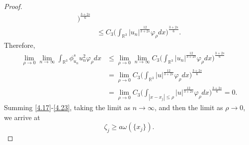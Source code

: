 \documentclass[11pt]{article}
\numberwithin{equation}{section}
\begin{document}
\begin{proof}
\begin{align*}
  \Big)^{\frac{3+2s}{6}}\\
&\leq  C_3 \Big(\int_{\mathbb{R}^3}{|u_n|}^{\frac{12}{3+2s}}\varphi_\rho dx
 \Big)^{\frac{3+2s}{6}}.
\end{align*}
Therefore,
\begin{equation}\label{4.23}
\begin{split}
\lim_{\rho\to 0}\lim_{n\to\infty}\int_{\mathbb{R}^3}\phi^s_{u_n}u^2_n\varphi_\rho dx
&\leq  \lim_{\rho\to 0}\lim_{n\to\infty} C_3
 \Big(\int_{\mathbb{R}^3}{|u_n|}^{\frac{12}{3+2s}}\varphi_\rho dx\Big)^{\frac{3+2s}{6}}\\
&= \lim_{\rho\to 0}C_3
 \Big(\int_{\mathbb{R}^3}{|u|}^{\frac{12}{3+2s}}\varphi_\rho dx\Big)^{\frac{3+2s}{6}}\\
&= \lim_{\rho\to 0}C_3
 \Big(\int_{|x-x_j|\leq\rho}{|u|}^{\frac{12}{3+2s}}\varphi_\rho dx\Big)^{\frac{3+2s}{6}}=0.
\end{split}
\end{equation}
Summing \eqref{4.17}-\eqref{4.23}, taking the limit as $n\to\infty$, and
then the limit as $\rho\to 0$, we arrive at
$$
\zeta_j\geq a\omega(\{x_j\}).
$$
\smallskip


\end{proof}
\end{document}
